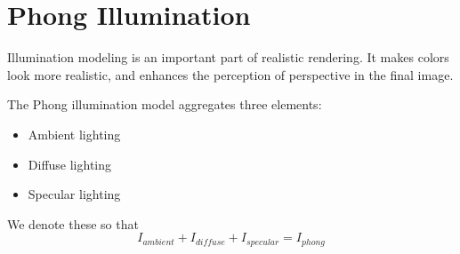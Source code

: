 \section{Phong Illumination}
Illumination modeling is an important part of realistic rendering. It makes
colors look more realistic, and enhances the perception of perspective in the final
image.

The Phong illumination model aggregates three elements:
\begin{itemize}
\item Ambient lighting
\item Diffuse lighting
\item Specular lighting
\end{itemize}

We denote these so that $$I_{ambient} + I_{diffuse} + I_{specular} =
I_{phong}$$




